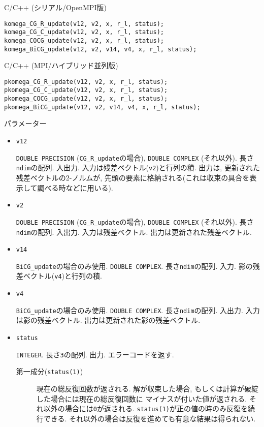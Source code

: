 \documentclass[12pt,titlepage]{jarticle}
\begin{document}
\noindent C/C++ (シリアル/OpenMPI版)
\begin{verbatim}
komega_CG_R_update(v12, v2, x, r_l, status);
komega_CG_C_update(v12, v2, x, r_l, status);
komega_COCG_update(v12, v2, x, r_l, status);
komega_BiCG_update(v12, v2, v14, v4, x, r_l, status);
\end{verbatim}

\noindent C/C++ (MPI/ハイブリッド並列版)
\begin{verbatim}
pkomega_CG_R_update(v12, v2, x, r_l, status);
pkomega_CG_C_update(v12, v2, x, r_l, status);
pkomega_COCG_update(v12, v2, x, r_l, status);
pkomega_BiCG_update(v12, v2, v14, v4, x, r_l, status);
\end{verbatim}

\noindent パラメーター

\begin{itemize}

\item \verb|v12|

  \verb|DOUBLE PRECISION| (\verb|CG_R_update|の場合),
  \verb|DOUBLE COMPLEX| (それ以外).
  長さ\verb|ndim|の配列. 入出力.
  入力は残差ベクトル(\verb|v2|)と行列の積.
  出力は, 更新された残差ベクトルの2-ノルムが,
  先頭の要素に格納される(これは収束の具合を表示して調べる時などに用いる).

\item \verb|v2|

  \verb|DOUBLE PRECISION| (\verb|CG_R_update|の場合),
  \verb|DOUBLE COMPLEX| (それ以外).
  長さ\verb|ndim|の配列. 入出力.
  入力は残差ベクトル.
  出力は更新された残差ベクトル.

\item \verb|v14|
  
  \verb|BiCG_update|の場合のみ使用. \verb|DOUBLE COMPLEX|.
  長さ\verb|ndim|の配列. 入力.
  影の残差ベクトル(\verb|v4|)と行列の積.
  
\item \verb|v4|
  
  \verb|BiCG_update|の場合のみ使用. \verb|DOUBLE COMPLEX|.
  長さ\verb|ndim|の配列. 入出力.
  入力は影の残差ベクトル.
  出力は更新された影の残差ベクトル.

\item \verb|status|

  \verb|INTEGER|. 長さ\verb|3|の配列. 出力. エラーコードを返す.
  \begin{description}
  \item [第一成分(\texttt{status(1)})]
    現在の総反復回数が返される.
    解が収束した場合, もしくは計算が破綻した場合には現在の総反復回数に
    マイナスが付いた値が返される.
    それ以外の場合には\verb|0|が返される.
    \verb|status(1)|が正の値の時のみ反復を続行できる.
    それ以外の場合は反復を進めても有意な結果は得られない.
    

\end{description}
\end{itemize}
\end{document}
